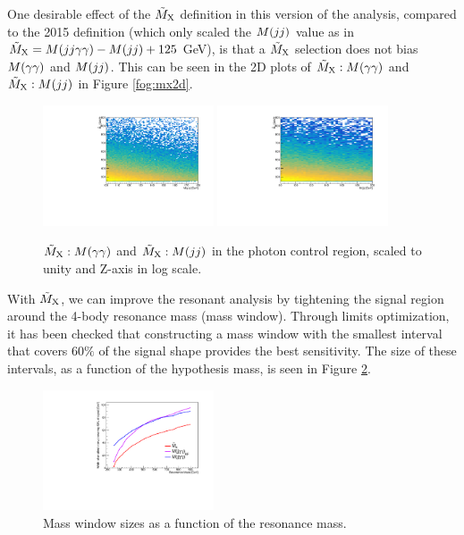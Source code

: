 One desirable effect of the $\tilde{M}_{\mathrm{X}}$ definition in this version of the analysis, compared to the 2015 definition (which only scaled the $M(jj)$ value as in $\tilde{M}_{\mathrm{X}} = M(jj\gamma\gamma) - M(jj) + 125$ GeV), is that a $\tilde{M}_{\mathrm{X}}$ selection does not bias $M(\gamma\gamma)$ and $M(jj)$. 
This can be seen in the 2D plots of $\tilde{M}_{\mathrm{X}}:M(\gamma\gamma)$ and $\tilde{M}_{\mathrm{X}}:M(jj)$ in Figure \ref{fog:mx2d}. 

\begin{figure}[thb]
  \centering
  \includegraphics[width=0.45\textwidth]{figures/sec-window/mgg2d.pdf}\hfil
  \includegraphics[width=0.45\textwidth]{figures/sec-window/mjj2d.pdf}\hfil
  \caption{$\tilde{M}_{\mathrm{X}}:M(\gamma\gamma)$ and $\tilde{M}_{\mathrm{X}}:M(jj)$ in the photon control region, scaled to unity and Z-axis in log scale. }
  \label{fig:mx2d}
\end{figure}

With $\tilde{M}_{\mathrm{X}}$, we can improve the resonant analysis by tightening the signal region around the 4-body resonance mass (mass window). 
Through limits optimization, it has been checked that constructing a mass window with the smallest interval that covers $60\%$ of the signal shape provides the best sensitivity. 
The size of these intervals, as a function of the hypothesis mass, is seen in Figure \ref{fig:masswindowwidths}. 

\begin{figure}[thb]
  \centering
  \includegraphics[width=0.45\textwidth]{figures/sec-window/width_60_prime.pdf}\hfil

  \caption{Mass window sizes as a function of the resonance mass. }
  \label{fig:masswindowwidths}
\end{figure}

